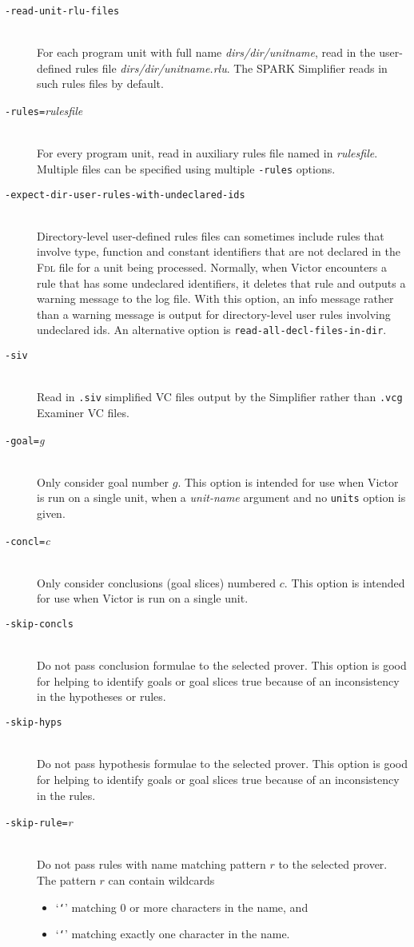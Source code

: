 \documentclass[12pt,fleqn]{article}
\newcommand{\fdl}{\textsc{Fdl}}
\newcommand{\goalreportfile}{\textsc{vct}}
\newcommand{\ttstar}{{\tt \char`\*}}
\newcommand{\ttqmark}{{\tt \char`\?}}
\newcommand{\optionb}[1]{\item[\texttt{-{#1}}]\ \\}
\newcommand{\optionv}[2]{\item[\texttt{-{#1}=}\mdseries\textit{#2}]\ \\}
\begin{document}
\begin{description}
  \optionb{read-unit-rlu-files}
  For each program unit with full name \textit{dirs/dir/unitname},
  read in the user-defined rules file \textit{dirs/dir/unitname.rlu}.  
  The SPARK Simplifier reads in such rules files by default.

  \optionv{rules}{rulesfile} For every program unit, read in
    auxiliary rules file named in \textit{rulesfile}.  Multiple files
    can be specified using multiple \texttt{-rules} options.

  \optionb{expect-dir-user-rules-with-undeclared-ids}
  Directory-level user-defined rules files can sometimes include rules
  that involve type, function and constant identifiers that are not
  declared in the \fdl{} file for a unit being processed.  Normally, when
  Victor encounters a rule that has some undeclared identifiers, it
  deletes that rule and outputs a warning message to the log file.
  With this option, an info message rather than a warning message is
  output for directory-level user rules involving undeclared ids.  An
  alternative option is \texttt{read-all-decl-files-in-dir}.

  \optionb{siv} Read in \texttt{.siv} simplified VC files output by the
     Simplifier rather than \texttt{.vcg} Examiner VC files.

\optionv{goal}{g} Only consider goal number $g$.
  This option is intended for use when Victor is run on a single unit,
  when a \textit{unit-name} argument and no \texttt{units} option is
  given.

\optionv{concl}{c} Only consider conclusions (goal slices) numbered $c$.  
  This option is intended for use when Victor is run on a single unit.

\optionb{skip-concls}
  Do not pass conclusion formulae to the selected prover.  This option is
  good for helping to identify goals or goal slices true because of an
  inconsistency in the hypotheses or rules.

\optionb{skip-hyps}
  Do not pass hypothesis formulae to the selected prover.  This option is
  good for helping to identify goals or goal slices true because of an
  inconsistency in the rules.

\optionv{skip-rule}{r} Do not pass rules with name matching pattern $r$ to
  the selected prover. The pattern $r$ can contain wildcards
  \begin{itemize}
  \item `\ttstar{}' matching 0 or more characters in the name, and
  \item `\ttqmark{}' matching exactly one character in the name.
  \end{itemize}


\end{description}
\end{document}
